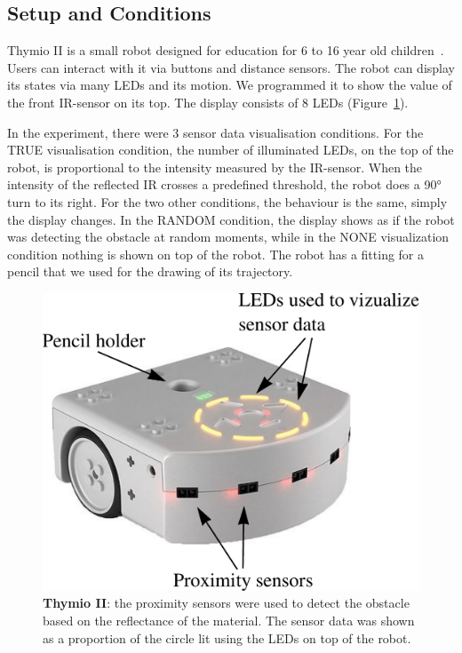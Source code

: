 \documentclass{sig-alternate}
\begin{document}
\subsection{Setup and Conditions}

Thymio II is a small robot designed for education for 6 to 16 year old
children~\cite{magnenat2012programming, riedo2012two}. Users can interact with
it via buttons and distance sensors. The robot can display its states via many
LEDs and its motion. We programmed it to show the value of the front IR-sensor
on its top. The display consists of 8 LEDs (Figure~\ref{thymio}).

In the experiment, there were 3 sensor data visualisation conditions.  For the
{\sf TRUE} visualisation condition, the number of illuminated LEDs, on the top of the
robot, is proportional to the intensity measured by the IR-sensor. When the
intensity of the reflected IR crosses a predefined threshold, the robot does a
90° turn to its right. For the two other conditions, the behaviour is the same,
simply the display changes. In the {\sf RANDOM} condition, the display shows as if the
robot was detecting the obstacle at random moments, while in the {\sf NONE}
visualization condition nothing is shown on top of the robot. The robot has a
fitting for a pencil that we used for the drawing of its trajectory.

\begin{figure}
    \centering
    \includegraphics[width=0.9\linewidth]{thymio}
    \caption{\small \textbf{Thymio II}: the proximity sensors were used to
    detect the obstacle based on the reflectance of the material. The sensor
    data was shown as a proportion of the circle lit using the LEDs on top of the
    robot.}

    \label{thymio}
\end{figure}
\end{document}
